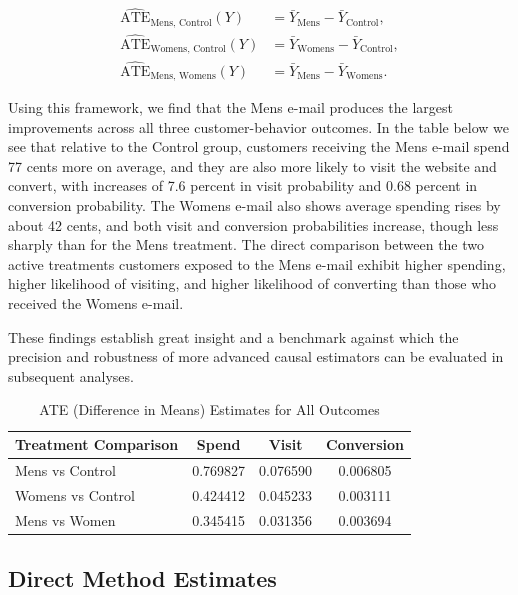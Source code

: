 \documentclass[10pt]{article}
\begin{document}
\begin{align*}
\widehat{\text{ATE}}_{\text{Mens, Control}}(Y)
    &= \bar{Y}_{\text{Mens}} - \bar{Y}_{\text{Control}}, \\
\widehat{\text{ATE}}_{\text{Womens, Control}}(Y)
    &= \bar{Y}_{\text{Womens}} - \bar{Y}_{\text{Control}}, \\
\widehat{\text{ATE}}_{\text{Mens, Womens}}(Y)
    &= \bar{Y}_{\text{Mens}} - \bar{Y}_{\text{Womens}}.
\end{align*}

Using this framework, we find that the Mens e-mail produces the largest improvements across all three customer-behavior outcomes. In the table below we see that relative to the Control group, customers receiving the Mens e-mail spend 77 cents more on average, and they are also more likely to visit the website and convert, with increases of 7.6 percent in visit probability and 0.68 percent in conversion probability. The Womens e-mail also shows average spending rises by about 42 cents, and both visit and conversion probabilities increase, though less sharply than for the Mens treatment. The direct comparison between the two active treatments  customers exposed to the Mens e-mail exhibit higher spending, higher likelihood of visiting, and higher likelihood of converting than those who received the Womens e-mail. 

 These findings establish great insight and a benchmark against which the precision and robustness of more advanced causal estimators can be evaluated in subsequent analyses.

\begin{table}[H]
\centering
\caption{ATE (Difference in Means) Estimates for All Outcomes}
\begin{tabular}{lccc}
\toprule
\textbf{Treatment Comparison} & \textbf{Spend} & \textbf{Visit} & \textbf{Conversion} \\
\midrule
Mens vs Control   & 0.769827 & 0.076590 & 0.006805 \\
Womens vs Control & 0.424412 & 0.045233 & 0.003111 \\
Mens vs Women     & 0.345415 & 0.031356 & 0.003694 \\
\bottomrule
\end{tabular}
\end{table}



\subsection{Direct Method Estimates}
\end{document}
